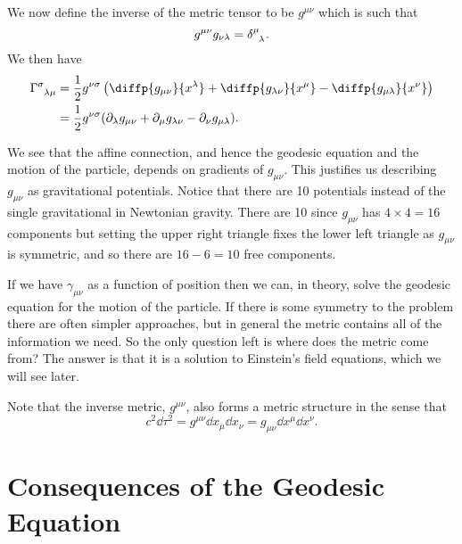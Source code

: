 \documentclass[fleqn]{NotesClass}
\newcommand*{\christoffel}[3]{\tensor{\Gamma}{^{#1}_{{#2}{#3}}}}
\begin{document}
    We now define the inverse of the metric tensor to be \(g^{\mu\nu}\) which is such that
    \begin{equation}
        g^{\mu\nu}g_{\nu\lambda} = \tensor{\delta}{^\mu_\lambda}.
    \end{equation}
    We then have
    \begin{align}
        \christoffel{\sigma}{\lambda}{\mu} &= \frac{1}{2}g^{\nu\sigma} \left( \diffp{g_{\mu\nu}}{x^\lambda} + \diffp{g_{\lambda\nu}}{x^\mu} - \diffp{g_{\mu\lambda}}{x^\nu} \right)\\
        &= \frac{1}{2}g^{\nu\sigma} (\partial_\lambda g_{\mu\nu} + \partial_\mu g_{\lambda\nu} - \partial_\nu g_{\mu\lambda}).
    \end{align}
    
    We see that the affine connection, and hence the geodesic equation and the motion of the particle, depends on gradients of \(g_{\mu\nu}\).
    This justifies us describing \(g_{\mu\nu}\) as gravitational potentials.
    Notice that there are 10 potentials instead of the single gravitational in Newtonian gravity.
    There are 10 since \(g_{\mu\nu}\) has \(4\times 4 = 16\) components but setting the upper right triangle fixes the lower left triangle as \(g_{\mu\nu}\) is symmetric, and so there are \(16 - 6 = 10\) free components.
    
    If we have \(\gamma_{\mu\nu}\) as a function of position then we can, in theory, solve the geodesic equation for the motion of the particle.
    If there is some symmetry to the problem there are often simpler approaches, but in general the metric contains all of the information we need.
    So the only question left is where does the metric come from?
    The answer is that it is a solution to Einstein's field equations, which we will see later.
    
    Note that the inverse metric, \(g^{\mu\nu}\), also forms a metric structure in the sense that
    \begin{equation}
        c^2\dd{\tau}^2 = g^{\mu\nu}\dd{x_\mu}\dd{x_\nu} = g_{\mu\nu}\dd{x^\mu}\dd{x^\nu}.
    \end{equation}

    \chapter{Consequences of the Geodesic Equation}
\end{document}
